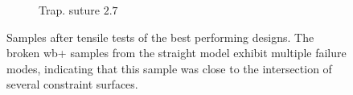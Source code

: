 \begin{figure}
\begin{subfigure}[B]{.22\columnwidth}
		\caption{Trap. suture $2.7$}
		\label{fig:failures_suture}
	\end{subfigure}
	\label{fig:failures}
	\caption{Samples after tensile tests of the best performing designs.
		The broken wb+ samples from the straight model exhibit multiple failure modes, indicating that this sample was close to the intersection of several constraint surfaces.}
\end{figure}






